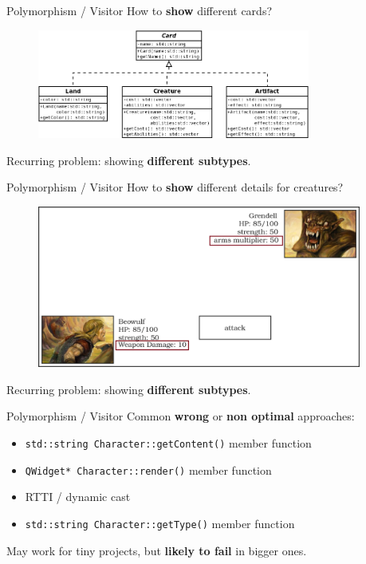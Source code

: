 \documentclass[11pt]{beamer}
\renewcommand{\emph}[1]{\textbf{#1}}
\begin{document}
\begin{frame}{Polymorphism / Visitor}
 How to \emph{show} different cards?
 \begin{figure}
  \includegraphics[width=0.80\textwidth]{assets/diagram-cards}
 \end{figure}
 Recurring problem: showing \emph{different subtypes}.
\end{frame}

\begin{frame}{Polymorphism / Visitor}
 How to \emph{show} different details for creatures?
 \begin{figure}
  \includegraphics[width=0.95\textwidth]{assets/figure-battle-scene-5}
 \end{figure}
 Recurring problem: showing \emph{different subtypes}.
\end{frame}

\begin{frame}{Polymorphism / Visitor}
 Common \emph{wrong} or \emph{non optimal} approaches:
 \begin{itemize}
  \item \texttt{std::string Character::getContent()} member function
  \item \texttt{QWidget* Character::render()} member function
  \item RTTI / dynamic cast
  \item \texttt{std::string Character::getType()} member function
 \end{itemize}
 May work for tiny projects, but \emph{likely to fail} in bigger ones.
\end{frame}
\end{document}
